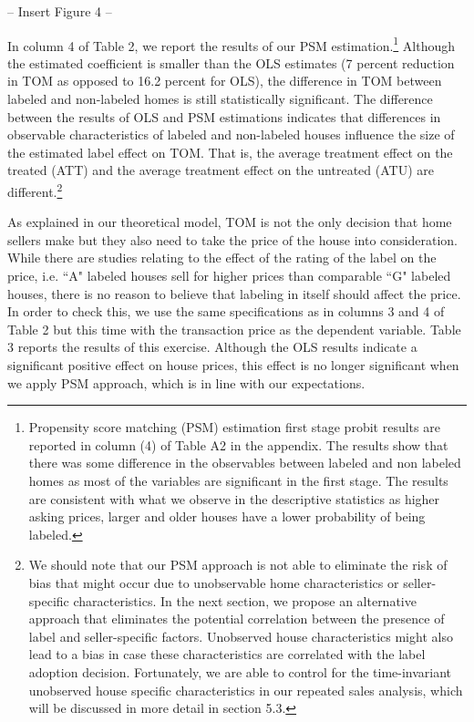 \documentclass[12pt]{article}
\begin{document}
\begin{center}
-- Insert Figure 4 --
\end{center}


In column 4 of Table 2, we report the results of our PSM estimation.\footnote{Propensity score matching (PSM) estimation first stage probit results are reported in column (4) of Table A2 in the appendix. The results show that there was some difference in the observables between labeled and non labeled homes as most of the variables are significant in the first stage. The results are consistent with what we observe in the descriptive statistics as higher asking prices, larger and older houses have a lower probability of being labeled.} Although the estimated coefficient is smaller than the OLS estimates (7 percent reduction in TOM as opposed to 16.2 percent for OLS), the difference in TOM between labeled and non-labeled homes is still statistically significant. The difference between the results of OLS and PSM estimations indicates that differences in observable characteristics of labeled and non-labeled houses influence the size of the estimated label effect on TOM. That is, the average treatment effect on the treated (ATT) and the average treatment effect on the untreated (ATU) are different.\footnote{We should note that our PSM approach is not able to eliminate the risk of bias that might occur due to unobservable home characteristics or seller-specific characteristics. In the next section, we propose an alternative approach that eliminates the potential correlation between the presence of label and seller-specific factors. Unobserved house characteristics might also lead to a bias in case these characteristics are correlated with the label adoption decision. Fortunately, we are able to control for the time-invariant unobserved house specific characteristics in our repeated sales analysis, which will be discussed in more detail in section 5.3.}

As explained in our theoretical model, TOM is not the only decision that home sellers make but they also need to take the price of the house into consideration. While there are studies relating to the effect of the rating of the label on the price, i.e. ``A" labeled houses sell for higher prices than comparable ``G" labeled houses, there is no reason to believe that labeling in itself should affect the price. In order to check this, we use the same specifications as in columns 3 and 4 of Table 2 but this time with the transaction price as the dependent variable. Table 3 reports the results of this exercise. Although the OLS results indicate a significant positive effect on house prices, this effect is no longer significant when we apply PSM approach, which is in line with our expectations.
\end{document}

